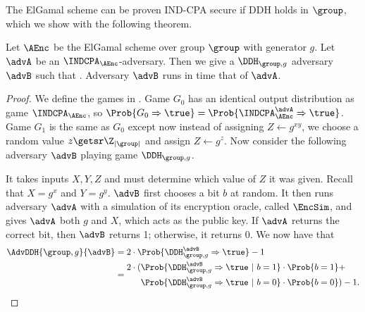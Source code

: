 The ElGamal scheme can be proven IND-CPA secure if DDH holds in $\group$, which we show with the following theorem. 

\begin{theorem}
\label{proof:elgamal}
	Let $\AEnc$ be the ElGamal scheme over group $\group$ with generator $g$. 
	Let $\advA$ be an $\INDCPA_\AEnc$-adversary. Then we give a $\DDH_{\group,g}$ 
	adversary $\advB$ such that 
	\bnm
	\AdvINDCPA{\AEnc}{\advA} \cdotsm {} \;.
	\enm
	Adversary $\advB$ runs in time that of $\advA$. 
\end{theorem} 
	
\begin{proof}
	We define the games in . Game $G_0$ has an identical output distribution as game $\INDCPA_{\AEnc}$, so $\Prob{G_0\Rightarrow\true} = \Prob{\INDCPA_{\AEnc}^\advA\Rightarrow\true}$. Game $G_1$ is the same as $G_0$ except now instead of assigning $Z \gets g^{xy}$, we choose a random value $z \getsr \Z_{|\group|}$ and assign $Z \gets g^z$. Now consider the following adversary $\advB$ playing game $\DDH_{\group, g}$. 
	
	\begin{center}
	\end{center}
	
	It takes inputs $X,Y,Z$ and must determine which value of $Z$ it was given. Recall that $X = g^x$ and $Y = g^y$. $\advB$ first chooses a bit $b$ at random. It then runs adversary $\advA$ with a simulation of its encryption oracle, called $\EncSim$, and gives $\advA$ both $g$ and $X$, which acts as the public key. If $\advA$ returns the correct bit, then $\advB$ returns 1; otherwise, it returns 0. We now have that
	\begin{align*}
		\AdvDDH{\group,g}{\advB} &= 2 \cdot \Prob{\DDH_{\group, g}^\advB\Rightarrow\true} - 1 \\
		&=
		\begin{aligned}
			2 \cdot (&\Prob{\DDH_{\group, g}^\advB\Rightarrow\true \ | \ b=1}\cdot\Prob{b=1} + \\
			&\Prob{\DDH_{\group, g}^\advB\Rightarrow\true \ | \ b=0}\cdot\Prob{b=0}) - 1 .
		\end{aligned}
	\end{align*} 
	

\end{proof}

